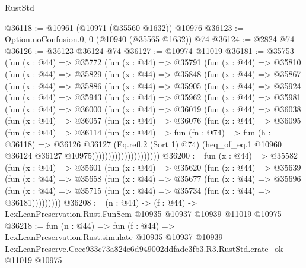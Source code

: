 \begin{lexlean}{RustStd}
\begin{coremodule}
@36118 := @10961 (@10971 (@35560 @1632)) @10976
@36123 := Option.noConfusion.{0, 0} (@10940 (@35565 @1632)) @74
@36124 := @2824 @74
@36126 := @36123 @36124 @74
@36127 := @10974 @11019
@36181 := @35753
    (fun (x : @44) =>
    @35772
      (fun (x : @44) =>
      @35791
        (fun (x : @44) =>
        @35810
          (fun (x : @44) =>
          @35829
            (fun (x : @44) =>
            @35848
              (fun (x : @44) =>
              @35867
                (fun (x : @44) =>
                @35886
                  (fun (x : @44) =>
                  @35905
                    (fun (x : @44) =>
                    @35924
                      (fun (x : @44) =>
                      @35943
                        (fun (x : @44) =>
                        @35962
                          (fun (x : @44) =>
                          @35981
                            (fun (x : @44) =>
                            @36000
                              (fun (x : @44) =>
                              @36019
                                (fun (x : @44) =>
                                @36038
                                  (fun (x : @44) =>
                                  @36057
                                    (fun (x : @44) =>
                                    @36076
                                      (fun (x : @44) =>
                                      @36095
                                        (fun (x : @44) =>
                                        @36114
                                          (fun (x : @44) =>
                                          fun (fn : @74) =>
                                          fun (h : @36118) =>
                                          @36126
                                            @36127
                                            (Eq.refl.{2} (Sort 1) @74)
                                            (heq_of_eq.{1}
                                              @10960
                                              @36124
                                              @36127
                                              @10975)))))))))))))))))))))
@36200 := fun (x : @44) =>
  @35582
    (fun (x : @44) =>
    @35601
      (fun (x : @44) =>
      @35620
        (fun (x : @44) =>
        @35639
          (fun (x : @44) =>
          @35658
            (fun (x : @44) =>
            @35677
              (fun (x : @44) =>
              @35696
                (fun (x : @44) => @35715 (fun (x : @44) => @35734 (fun (x : @44) => @36181)))))))))
@36208 := (n : @44) ->
  (f : @44) -> LexLeanPreservation.Rust.FunSem @10935 @10937 @10939 @11019 @10975
@36218 := fun (n : @44) =>
  fun (f : @44) =>
  LexLeanPreservation.Rust.simulate
    @10935
    @10937
    @10939
    LexLeanPreserve.Cecc933c73a824e6d949002ddfade3fb3.R3.RustStd.crate_ok
    @11019
    @10975
\end{coremodule}
\end{lexlean}
